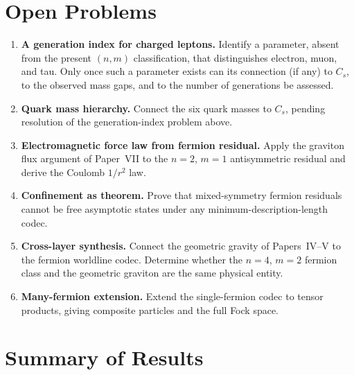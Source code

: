 \documentclass[11pt]{article}
\begin{document}
\section{Open Problems}
\label{sec:open}

\begin{enumerate}

  \item \textbf{A generation index for charged leptons.}
        Identify a parameter, absent from the present $(n,m)$
        classification, that distinguishes electron, muon, and tau.
        Only once such a parameter exists can its connection (if any)
        to $C_s$, to the observed mass gaps, and to the number of
        generations be assessed.

  \item \textbf{Quark mass hierarchy.}
        Connect the six quark masses to $C_s$, pending resolution of
        the generation-index problem above.

  \item \textbf{Electromagnetic force law from fermion residual.}
        Apply the graviton flux argument of Paper~VII to the
        $n{=}2$, $m{=}1$ antisymmetric residual and derive the
        Coulomb $1/r^2$ law.

  \item \textbf{Confinement as theorem.}
        Prove that mixed-symmetry fermion residuals cannot be free
        asymptotic states under any minimum-description-length codec.

  \item \textbf{Cross-layer synthesis.}
        Connect the geometric gravity of Papers~IV--V to the
        fermion worldline codec.
        Determine whether the $n{=}4$, $m{=}2$ fermion class and
        the geometric graviton are the same physical entity.

  \item \textbf{Many-fermion extension.}
        Extend the single-fermion codec to tensor products,
        giving composite particles and the full Fock space.

\end{enumerate}

\section{Summary of Results}
\label{sec:results}
\end{document}
